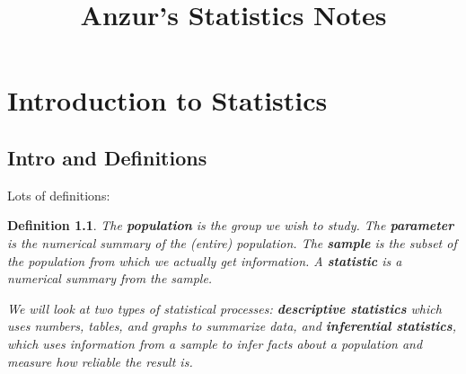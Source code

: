 \documentclass[letterpaper, 11pt, openany]{book}
\title{Anzur's Statistics Notes}
\theoremstyle{mytheoremstyle}
\newtheorem{definition}{Definition}[section]
\theoremstyle{myexamplestyle}
\begin{document}
\frontmatter


\begin{center}
    {\sffamily\huge{}\selectfont \MyTitle}
\end{center}

\pagestyle{empty}

\makeatletter
{}
\makeatother

\newpage

\mainmatter

\pagestyle{fancy}



\thispagestyle{firstofchapter}
\chapter{Introduction to Statistics}
\section{Intro and Definitions}
\setcounter{figure}{0}

Lots of definitions:

\begin{tcolorbox}
    \begin{definition}\label{def:intro}
        The \textbf{population} is the group we wish to study. The \textbf{parameter} is the numerical summary of the (entire) population. The \textbf{sample} is the subset of the population from which we actually get information. A \textbf{statistic} is a numerical summary from the sample.
    
        We will look at two types of statistical processes: \textbf{descriptive statistics} which uses numbers, tables, and graphs to summarize data, and \textbf{inferential statistics}, which uses information from a sample to infer facts about a population and measure how reliable the result is.
    \end{definition}
\end{tcolorbox}
\end{document}
